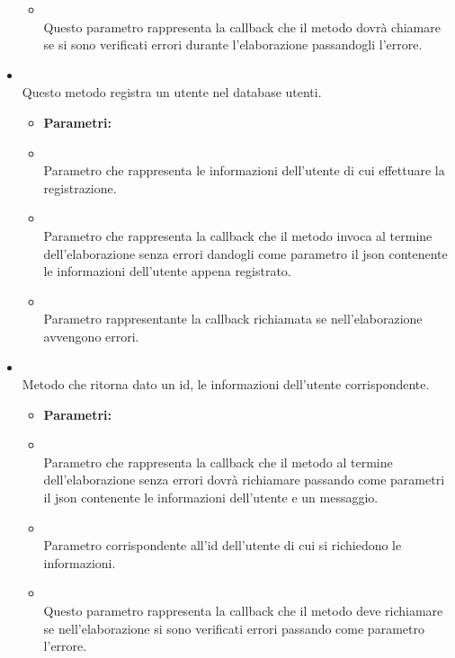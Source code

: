 \begin{itemize}
\begin{itemize}
\item[]  \\ Questo parametro rappresenta la callback che il metodo dovrà chiamare se si sono verificati errori durante l'elaborazione passandogli l'errore.
\end{itemize}
\item[] \textbf{} \\ Questo metodo registra un utente nel database utenti.
\begin{itemize}\addtolength{\itemsep}{-0.5\baselineskip}
\item[] \textbf{Parametri:}
\item[]  \\ Parametro che rappresenta le informazioni dell'utente di cui effettuare la registrazione.
\item[]  \\ Parametro che rappresenta la callback che il metodo invoca al termine dell'elaborazione senza errori dandogli come parametro il json contenente le informazioni dell'utente appena registrato.
\item[]  \\ Parametro rappresentante la callback richiamata se nell'elaborazione avvengono errori.
\end{itemize}
\item[] \textbf{} \\ Metodo che ritorna dato un id, le informazioni dell'utente corrispondente.
\begin{itemize}\addtolength{\itemsep}{-0.5\baselineskip}
\item[] \textbf{Parametri:}
\item[]  \\ Parametro che rappresenta la callback che il metodo al termine dell'elaborazione senza errori dovrà richiamare passando come parametri il json contenente le informazioni dell'utente e un messaggio.
\item[]  \\ Parametro corrispondente all'id dell'utente di cui si richiedono le informazioni. 
\item[]  \\ Questo parametro rappresenta la callback che il metodo deve richiamare se nell'elaborazione si sono verificati errori passando come parametro l'errore.

\end{itemize}
\end{itemize}
